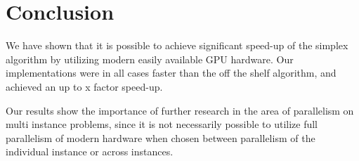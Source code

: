 \section{Conclusion}
We have shown that it is possible to achieve significant speed-up of the simplex algorithm by utilizing modern easily available GPU hardware. Our implementations were in all cases faster than the off the shelf algorithm, and achieved an up to x factor speed-up.

Our results show the importance of further research in the area of parallelism on multi instance problems, since it is not necessarily possible to utilize full parallelism of modern hardware when chosen between parallelism of the individual instance or across instances.